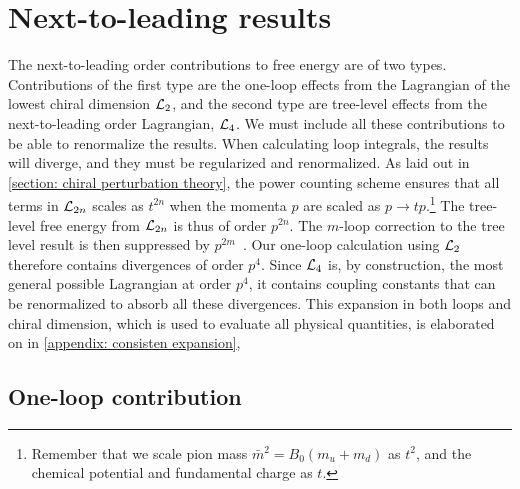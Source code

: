 \section{Next-to-leading results}
\label{section: nlo thermodynamics}


The next-to-leading order contributions to free energy are of two types.
Contributions of the first type are the one-loop effects from the Lagrangian of the lowest chiral dimension $\mathcal{L}_2$, and the second type are tree-level effects from the next-to-leading order Lagrangian, $\mathcal{L}_4$.
We must include all these contributions to be able to renormalize the results.
When calculating loop integrals, the results will diverge, and they must be regularized and renormalized.
As laid out in \autoref{section: chiral perturbation theory}, the power counting scheme ensures that all terms in $\mathcal{L}_{2n}$ scales as $t^{2n}$ when the momenta $p$ are scaled as  $p \rightarrow t p$.\footnote{
    Remember that we scale pion mass $\bar m^2 = B_0(m_u + m_d)$ as $t^2$, and the chemical potential and fundamental charge as $t$.
    }
The tree-level free energy from $\mathcal{L}_{2n}$ is thus of order $p^{2n}$.
The $m$-loop correction to the tree level result is then suppressed by $p^{2m}$~\autocite{gasserChiralPerturbationTheory1984,weinbergPhenomenologicalLagrangians1979}.
Our one-loop calculation using $\mathcal{L}_2$ therefore contains divergences of order $p^{4}$. 
Since $\mathcal{L}_4$ is, by construction, the most general possible Lagrangian at order $p^4$, it contains coupling constants that can be renormalized to absorb all these divergences.
This expansion in both loops and chiral dimension, which is used to evaluate all physical quantities, is elaborated on in \autoref{appendix: consisten expansion},


\subsection{One-loop contribution}

